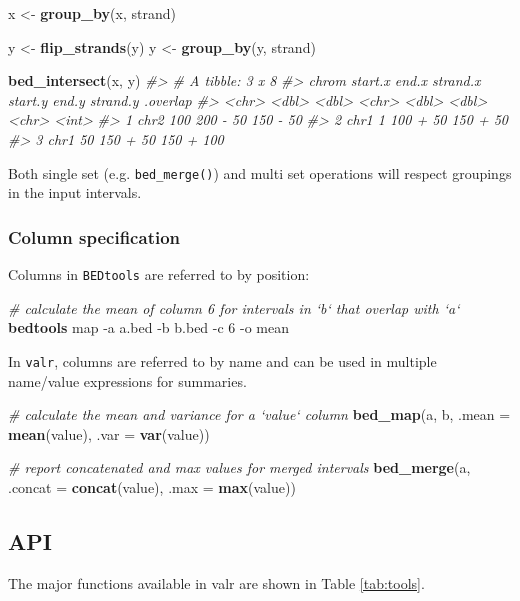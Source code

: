 \documentclass[9pt,a4paper]{extarticle}
\renewcommand{\KeywordTok}[1]{\textbf{{#1}}}
\renewcommand{\DataTypeTok}[1]{\textcolor[rgb]{0.50,0.00,0.00}{{#1}}}
\renewcommand{\StringTok}[1]{\textcolor[rgb]{0.87,0.00,0.00}{{#1}}}
\renewcommand{\CommentTok}[1]{\textcolor[rgb]{0.50,0.50,0.50}{\textit{{#1}}}}
\renewcommand{\NormalTok}[1]{{#1}}
\begin{document}
\begin{Highlighting}[]
\NormalTok{x <-}\StringTok{ }\KeywordTok{group_by}\NormalTok{(x, strand)}

\NormalTok{y <-}\StringTok{ }\KeywordTok{flip_strands}\NormalTok{(y)}
\NormalTok{y <-}\StringTok{ }\KeywordTok{group_by}\NormalTok{(y, strand)}

\KeywordTok{bed_intersect}\NormalTok{(x, y)}
\CommentTok{#> # A tibble: 3 x 8}
\CommentTok{#>   chrom start.x end.x strand.x start.y end.y strand.y .overlap}
\CommentTok{#>   <chr>   <dbl> <dbl>    <chr>   <dbl> <dbl>    <chr>    <int>}
\CommentTok{#> 1  chr2     100   200        -      50   150        -       50}
\CommentTok{#> 2  chr1       1   100        +      50   150        +       50}
\CommentTok{#> 3  chr1      50   150        +      50   150        +      100}
\end{Highlighting}

Both single set (e.g. \texttt{bed\_merge()}) and multi set operations
will respect groupings in the input intervals.

\subsubsection{Column specification}\label{column-specification}

Columns in \texttt{BEDtools} are referred to by position:

\begin{Highlighting}[]
\CommentTok{# calculate the mean of column 6 for intervals in `b` that overlap with `a`}
\KeywordTok{bedtools} \NormalTok{map -a a.bed -b b.bed -c 6 -o mean}
\end{Highlighting}

In \texttt{valr}, columns are referred to by name and can be used in
multiple name/value expressions for summaries.

\begin{Highlighting}[]
\CommentTok{# calculate the mean and variance for a `value` column}
\KeywordTok{bed_map}\NormalTok{(a, b, }\DataTypeTok{.mean =} \KeywordTok{mean}\NormalTok{(value), }\DataTypeTok{.var =} \KeywordTok{var}\NormalTok{(value))}

\CommentTok{# report concatenated and max values for merged intervals}
\KeywordTok{bed_merge}\NormalTok{(a, }\DataTypeTok{.concat =} \KeywordTok{concat}\NormalTok{(value), }\DataTypeTok{.max =} \KeywordTok{max}\NormalTok{(value))}
\end{Highlighting}


\subsection{API}\label{api}
The major functions available in valr are shown in Table \ref{tab:tools}. 
\end{document}
